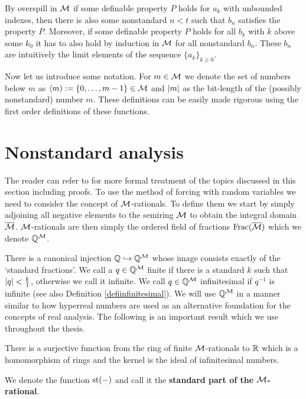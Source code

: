 By overspill in $\mathcal{M}$ if some definable property $P$ holds for $a_k$ with unbounded indexes, then there is also some nonstandard $n<t$ such that $b_n$ satisfies the property $P$. Moreover, if some definable property $P$ holds for all $b_k$ with $k$ above some $k_0$ it has to also hold by induction in $\mathcal{M}$ for all nonstandard $b_n$. These $b_n$ are intuitively the limit elements of the sequence $\{a_k\}_{k\geq0}$.

Now let us introduce some notation. For $m\in\mathcal{M}$ we denote the set of numbers below $m$ as $\langle m):=\{0,\dots,m-1\}\in\mathcal{M}$ and $\left|{m}\right|$ as the bit-length of the (possibly nonstandard) number $m$. These definitions can be easily made rigorous using the first order definitions of these functions.

\section*{Nonstandard analysis}

The reader can refer to \cite{goldbring2014lecture} for more formal treatment of the topics discussed in this section including proofs. To use the method of forcing with random variables we need to consider the concept of $\mathcal{M}$-rationals. To define them we start by simply adjoining all negative elements to the semiring $\mathcal{M}$ to obtain the integral domain $\overline {\mathcal{M}}$. $\mathcal{M}$-rationals are then simply the ordered field of fractions $\text{Frac}(\overline {\mathcal{M}})$ which we denote $\mathbb{Q}^{\mathcal{M}}$.

There is a canonical injection $\mathbb{Q} \hookrightarrow \mathbb{Q}^{\mathcal{M}}$ whose image consists exactly of the `standard fractions'. We call a $q\in\mathbb{Q}^{\mathcal{M}}$ finite if there is a standard $k$ such that $\left|{q}\right|<\frac{k}{1}$, otherwise we call it infinite. We call $q\in\mathbb{Q}^{\mathcal{M}}$ infinitesimal if $q^{-1}$ is infinite (see also Definition \ref{defiinfinitesimal}). We will use $\mathbb{Q}^{\mathcal{M}}$ in a manner similar to how hyperreal numbers are used as an alternative foundation for the concepts of real analysis. The following is an important result which we use throughout the thesis.

\begin{thrm*}
There is a surjective function from the ring of finite $\mathcal{M}$-rationals to $\mathbb{R}$ which is a homomorphism of rings and the kernel is the ideal of infinitesimal numbers.

We denote the function $\text{st}(-)$ and call it the \textbf{standard part of the $\mathcal{M}$-rational}.
\end{thrm*}


